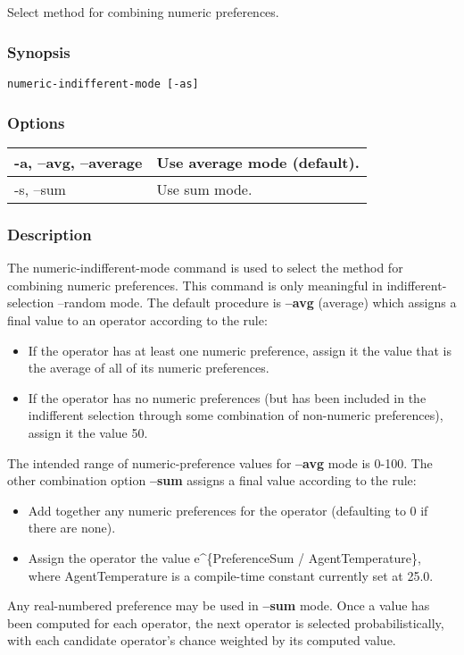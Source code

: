 \subsection{}
\label{numeric-indifferent-mode}
Select method for combining numeric preferences. 
\subsubsection*{Synopsis}
\begin{verbatim}
numeric-indifferent-mode [-as]
\end{verbatim}
\subsubsection*{Options}
\begin{tabular}{|l|l|}
\hline 
 -a, --avg, --average  & Use average mode (default).  \\
 \hline 
 -s, --sum  & Use sum mode.  \\
 \hline 
\end{tabular}
\subsubsection*{Description}
 The numeric-indifferent-mode command is used to select the method for combining numeric preferences. This command is only meaningful in indifferent-selection --random  mode. 
 The default procedure is \textbf{--avg}
 (average) which assigns a final value to an operator according to the rule: \begin{itemize}
\item  If the operator has at least one numeric preference, assign it the value that is the average of all of its numeric preferences. 
\item  If the operator has no numeric preferences (but has been included in the indifferent selection through some combination of non-numeric preferences), assign it the value 50. 
\end{itemize}
 The intended range of numeric-preference values for \textbf{--avg}
 mode is 0-100. 
 The other combination option \textbf{--sum}
 assigns a final value according to the rule: \begin{itemize}
\item  Add together any numeric preferences for the operator (defaulting to 0 if there are none). 
\item  Assign the operator the value e\^{}\{PreferenceSum / AgentTemperature\}, where AgentTemperature is a compile-time constant currently set at 25.0. 
\end{itemize}
 Any real-numbered preference may be used in \textbf{--sum}
 mode. 
 Once a value has been computed for each operator, the next operator is selected probabilistically, with each candidate operator's chance weighted by its computed value. 
